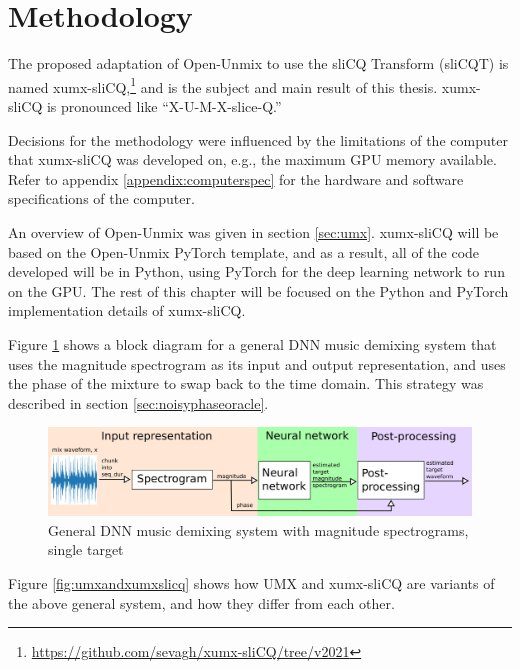 \documentclass[report.tex]{subfiles}
\begin{document}
\section{Methodology}
\label{sec:methodology}

The proposed adaptation of Open-Unmix to use the sliCQ Transform (sliCQT) is named xumx-sliCQ,\footnote{\url{https://github.com/sevagh/xumx-sliCQ/tree/v2021}} and is the subject and main result of this thesis. xumx-sliCQ is pronounced like ``X-U-M-X-slice-Q.''

Decisions for the methodology were influenced by the limitations of the computer that xumx-sliCQ was developed on, e.g., the maximum GPU memory available. Refer to appendix \ref{appendix:computerspec} for the hardware and software specifications of the computer.

An overview of Open-Unmix was given in section \ref{sec:umx}. xumx-sliCQ will be based on the Open-Unmix PyTorch template, and as a result, all of the code developed will be in Python, using PyTorch for the deep learning network to run on the GPU. The rest of this chapter will be focused on the Python and PyTorch implementation details of xumx-sliCQ.

Figure \ref{fig:generalmdx} shows a block diagram for a general DNN music demixing system that uses the magnitude spectrogram as  its input and output representation, and uses the phase of the mixture to swap back to the time domain. This strategy was described in section \ref{sec:noisyphaseoracle}.

\begin{figure}[ht]
	\centering
	\includegraphics[width=\textwidth]{./images-blockdiagrams/generic_mdx.png}
	\caption{General DNN music demixing system with magnitude spectrograms, single target}
	\label{fig:generalmdx}
\end{figure}

Figure \ref{fig:umxandxumxslicq} shows how UMX and xumx-sliCQ are variants of the above general system, and how they differ from each other.
\end{document}
